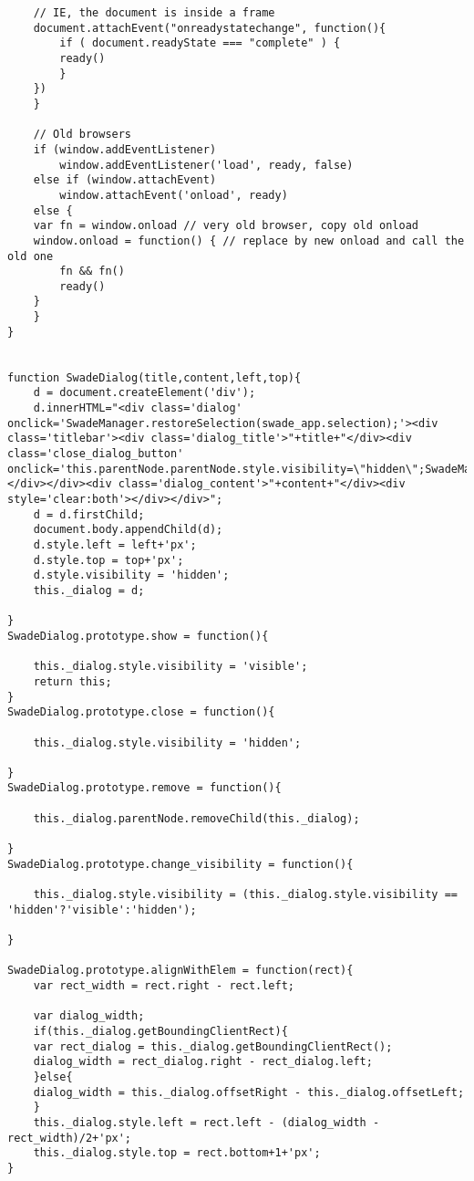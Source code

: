 \begin{lstlisting}
	// IE, the document is inside a frame
	document.attachEvent("onreadystatechange", function(){
	    if ( document.readyState === "complete" ) {
		ready()
	    }
	})
    }

    // Old browsers
    if (window.addEventListener)
        window.addEventListener('load', ready, false)
    else if (window.attachEvent)
        window.attachEvent('onload', ready)
    else {
	var fn = window.onload // very old browser, copy old onload
	window.onload = function() { // replace by new onload and call the old one
	    fn && fn()
	    ready()
	}
    }
}


function SwadeDialog(title,content,left,top){
    d = document.createElement('div');
    d.innerHTML="<div class='dialog' onclick='SwadeManager.restoreSelection(swade_app.selection);'><div class='titlebar'><div class='dialog_title'>"+title+"</div><div class='close_dialog_button' onclick='this.parentNode.parentNode.style.visibility=\"hidden\";SwadeManager.restoreSelection(swade_app.selection);'></div></div><div class='dialog_content'>"+content+"</div><div style='clear:both'></div></div>";
    d = d.firstChild;
    document.body.appendChild(d);
    d.style.left = left+'px';
    d.style.top = top+'px';
    d.style.visibility = 'hidden';
    this._dialog = d;

}
SwadeDialog.prototype.show = function(){

    this._dialog.style.visibility = 'visible';
    return this;
}
SwadeDialog.prototype.close = function(){

    this._dialog.style.visibility = 'hidden';

}
SwadeDialog.prototype.remove = function(){

    this._dialog.parentNode.removeChild(this._dialog);

}
SwadeDialog.prototype.change_visibility = function(){

    this._dialog.style.visibility = (this._dialog.style.visibility == 'hidden'?'visible':'hidden');

}

SwadeDialog.prototype.alignWithElem = function(rect){
    var rect_width = rect.right - rect.left;

    var dialog_width;
    if(this._dialog.getBoundingClientRect){
	var rect_dialog = this._dialog.getBoundingClientRect();
	dialog_width = rect_dialog.right - rect_dialog.left;
    }else{
	dialog_width = this._dialog.offsetRight - this._dialog.offsetLeft;
    }
    this._dialog.style.left = rect.left - (dialog_width - rect_width)/2+'px';
    this._dialog.style.top = rect.bottom+1+'px';
}


\end{lstlisting}
